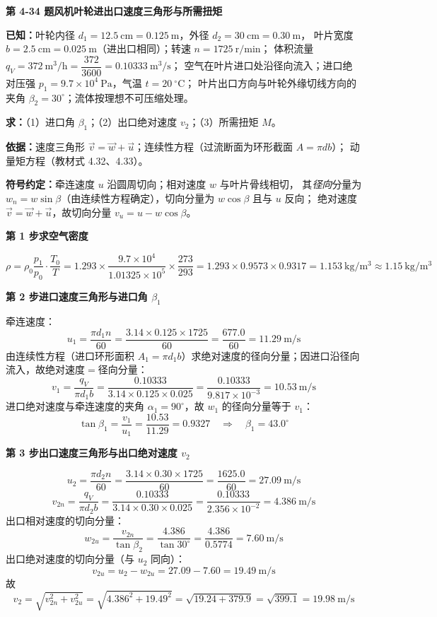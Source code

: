 \noindent\textbf{第 4-34 题\quad 风机叶轮进出口速度三角形与所需扭矩}

\begin{jie}
\textbf{已知：}叶轮内径 $d_1=12.5\ \mathrm{cm}=0.125\ \mathrm{m}$，外径 $d_2=30\ \mathrm{cm}=0.30\ \mathrm{m}$，
叶片宽度 $b=2.5\ \mathrm{cm}=0.025\ \mathrm{m}$（进出口相同）；转速 $n=1725\ \mathrm{r/min}$；
体积流量 $q_V=372\ \mathrm{m^3/h}=\dfrac{372}{3600}=0.10333\ \mathrm{m^3/s}$；
空气在叶片进口处沿径向流入；进口绝对压强 $p_1=9.7\times10^4\ \mathrm{Pa}$，气温 $t=20\ \mathrm{^\circ C}$；
叶片出口方向与叶轮外缘切线方向的夹角 $\beta_2=30^\circ$；流体按理想不可压缩处理。

\textbf{求：}（1）进口角 $\beta_1$；（2）出口绝对速度 $v_2$；（3）所需扭矩 $M$。

\textbf{依据：}速度三角形 $\vec v=\vec w+\vec u$；连续性方程（过流断面为环形截面 $A=\pi db$）；
动量矩方程（教材式 4.32、4.33）。

\textbf{符号约定：}牵连速度 $u$ 沿圆周切向；相对速度 $w$ 与叶片骨线相切，
其\emph{径向}分量为 $w_n=w\sin\beta$（由连续性方程确定），切向分量为 $w\cos\beta$ 且与 $u$ 反向；
绝对速度 $\vec v=\vec w+\vec u$，故切向分量 $v_u=u-w\cos\beta$。

\textbf{第 1 步\quad 求空气密度}

\[ \rho=\rho_0\frac{p_1}{p_0}\cdot\frac{T_0}{T}=1.293\times\frac{9.7\times10^4}{1.01325\times10^5}\times\frac{273}{293}
   =1.293\times0.9573\times0.9317=1.153\ \mathrm{kg/m^3}\approx1.15\ \mathrm{kg/m^3} \]

\textbf{第 2 步\quad 进口速度三角形与进口角 $\beta_1$}

牵连速度：
\[ u_1=\frac{\pi d_1n}{60}=\frac{3.14\times0.125\times1725}{60}=\frac{677.0}{60}=11.29\ \mathrm{m/s} \]
由连续性方程（进口环形面积 $A_1=\pi d_1b$）求绝对速度的径向分量；因进口沿径向流入，故绝对速度$=$径向分量：
\[ v_1=\frac{q_V}{\pi d_1b}=\frac{0.10333}{3.14\times0.125\times0.025}=\frac{0.10333}{9.817\times10^{-3}}=10.53\ \mathrm{m/s} \]
进口绝对速度与牵连速度的夹角 $\alpha_1=90^\circ$，故 $w_1$ 的径向分量等于 $v_1$：
\[ \tan\beta_1=\frac{v_1}{u_1}=\frac{10.53}{11.29}=0.9327\quad\Longrightarrow\quad\beta_1=43.0^\circ \]

\textbf{第 3 步\quad 出口速度三角形与出口绝对速度 $v_2$}

\[ u_2=\frac{\pi d_2n}{60}=\frac{3.14\times0.30\times1725}{60}=\frac{1625.0}{60}=27.09\ \mathrm{m/s} \]
\[ v_{2n}=\frac{q_V}{\pi d_2b}=\frac{0.10333}{3.14\times0.30\times0.025}=\frac{0.10333}{2.356\times10^{-2}}=4.386\ \mathrm{m/s} \]
出口相对速度的切向分量：
\[ w_{2u}=\frac{v_{2n}}{\tan\beta_2}=\frac{4.386}{\tan30^\circ}=\frac{4.386}{0.5774}=7.60\ \mathrm{m/s} \]
出口绝对速度的切向分量（与 $u_2$ 同向）：
\[ v_{2u}=u_2-w_{2u}=27.09-7.60=19.49\ \mathrm{m/s} \]
故
\[ v_2=\sqrt{v_{2n}^2+v_{2u}^2}=\sqrt{4.386^2+19.49^2}=\sqrt{19.24+379.9}=\sqrt{399.1}=19.98\ \mathrm{m/s} \]


\end{jie}
